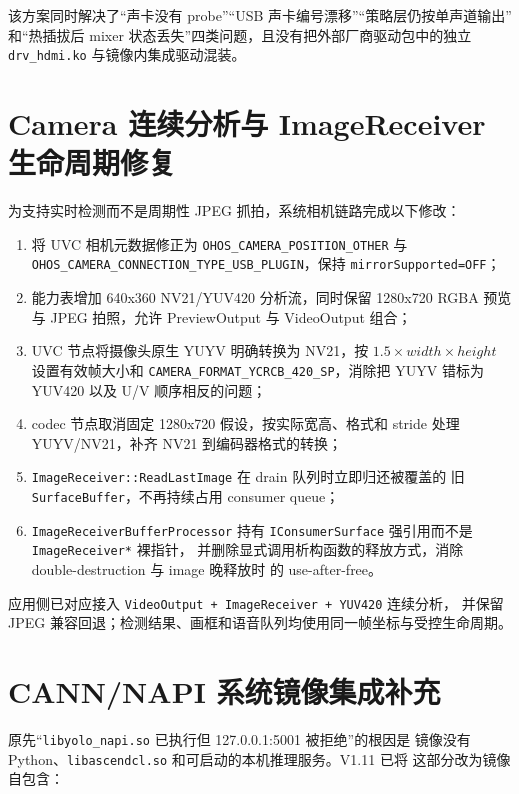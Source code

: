 该方案同时解决了“声卡没有 probe”“USB 声卡编号漂移”“策略层仍按单声道输出”
和“热插拔后 mixer 状态丢失”四类问题，且没有把外部厂商驱动包中的独立
\texttt{drv\_hdmi.ko} 与镜像内集成驱动混装。

\section{Camera 连续分析与 ImageReceiver 生命周期修复}

为支持实时检测而不是周期性 JPEG 抓拍，系统相机链路完成以下修改：

\begin{enumerate}
  \item 将 UVC 相机元数据修正为
  \texttt{OHOS\_CAMERA\_POSITION\_OTHER} 与
  \texttt{OHOS\_CAMERA\_CONNECTION\_TYPE\_USB\_PLUGIN}，保持
  \texttt{mirrorSupported=OFF}；
  \item 能力表增加 640x360 NV21/YUV420 分析流，同时保留 1280x720
  RGBA 预览与 JPEG 拍照，允许 PreviewOutput 与 VideoOutput 组合；
  \item UVC 节点将摄像头原生 YUYV 明确转换为 NV21，按
  $1.5\times width\times height$ 设置有效帧大小和
  \texttt{CAMERA\_FORMAT\_YCRCB\_420\_SP}，消除把 YUYV 错标为 YUV420
  以及 U/V 顺序相反的问题；
  \item codec 节点取消固定 1280x720 假设，按实际宽高、格式和 stride
  处理 YUYV/NV21，补齐 NV21 到编码器格式的转换；
  \item \texttt{ImageReceiver::ReadLastImage} 在 drain 队列时立即归还被覆盖的
  旧 \texttt{SurfaceBuffer}，不再持续占用 consumer queue；
  \item \texttt{ImageReceiverBufferProcessor} 持有
  \texttt{IConsumerSurface} 强引用而不是 \texttt{ImageReceiver*} 裸指针，
  并删除显式调用析构函数的释放方式，消除 double-destruction 与 image 晚释放时
  的 use-after-free。
\end{enumerate}

应用侧已对应接入 \texttt{VideoOutput + ImageReceiver + YUV420} 连续分析，
并保留 JPEG 兼容回退；检测结果、画框和语音队列均使用同一帧坐标与受控生命周期。

\section{CANN/NAPI 系统镜像集成补充}

原先“\texttt{libyolo\_napi.so} 已执行但 127.0.0.1:5001 被拒绝”的根因是
镜像没有 Python、\texttt{libascendcl.so} 和可启动的本机推理服务。V1.11 已将
这部分改为镜像自包含：

